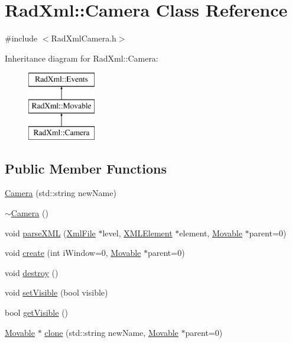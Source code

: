 \hypertarget{class_rad_xml_1_1_camera}{\section{Rad\-Xml\-:\-:Camera Class Reference}
\label{class_rad_xml_1_1_camera}
}


{\ttfamily \#include $<$Rad\-Xml\-Camera.\-h$>$}

Inheritance diagram for Rad\-Xml\-:\-:Camera\-:\begin{figure}[H]
\begin{center}
\leavevmode
\includegraphics[height=3.000000cm]{class_rad_xml_1_1_camera}
\end{center}
\end{figure}
\subsection*{Public Member Functions}
\begin{DoxyCompactItemize}
\item 
\hyperlink{class_rad_xml_1_1_camera_a3e82e569e1f6e5b48bb68d9624f9ba3f}{Camera} (std\-::string new\-Name)
\item 
\hyperlink{class_rad_xml_1_1_camera_ac7d3b520adefb9cc600282719623b881}{$\sim$\-Camera} ()
\item 
void \hyperlink{class_rad_xml_1_1_camera_a788b01c69c1375f9e45c0f4ef4ce19dc}{parse\-X\-M\-L} (\hyperlink{class_rad_xml_1_1_xml_file}{Xml\-File} $\ast$level, \hyperlink{class_x_m_l_element}{X\-M\-L\-Element} $\ast$element, \hyperlink{class_rad_xml_1_1_movable}{Movable} $\ast$parent=0)
\item 
void \hyperlink{class_rad_xml_1_1_camera_aa77ef056a3a5af0b5e6ed435a7d84ac9}{create} (int i\-Window=0, \hyperlink{class_rad_xml_1_1_movable}{Movable} $\ast$parent=0)
\item 
void \hyperlink{class_rad_xml_1_1_camera_a3e1c56430851395dfe48ca685ee11452}{destroy} ()
\item 
void \hyperlink{class_rad_xml_1_1_camera_a9f023dcd2c8718eafa160740da4ec770}{set\-Visible} (bool visible)
\item 
bool \hyperlink{class_rad_xml_1_1_camera_a23b65d0e998a3dc08e7327dab5c980ef}{get\-Visible} ()
\item 
\hyperlink{class_rad_xml_1_1_movable}{Movable} $\ast$ \hyperlink{class_rad_xml_1_1_camera_a8a97ff4d9995ee2299f80ce870e0d45c}{clone} (std\-::string new\-Name, \hyperlink{class_rad_xml_1_1_movable}{Movable} $\ast$parent=0)
\end{DoxyCompactItemize}
